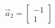 \documentclass[preview]{standalone}
\begin{document}
\begin{align*}
\vec{a}_2=\begin{bmatrix} -1 \\ 1 \end{bmatrix}
\end{align*}
\end{document}
